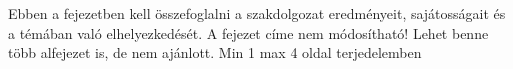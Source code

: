 \label{Chap:osszefoglalas}

Ebben a fejezetben kell összefoglalni a szakdolgozat eredményeit, sajátosságait és a témában való elhelyezkedését. A fejezet címe nem módosítható! Lehet benne több alfejezet is, de nem ajánlott. Min 1 max 4 oldal terjedelemben